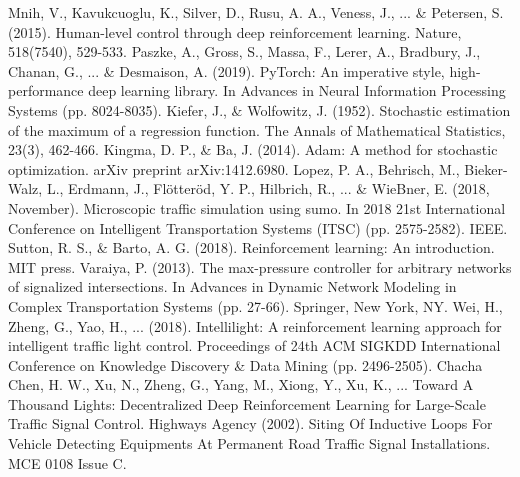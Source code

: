 \documentclass[conference]{IEEEtran}
\begin{document}
\begin{thebibliography}{00}
 Mnih, V., Kavukcuoglu, K., Silver, D., Rusu, A. A., Veness, J.,  ... \& Petersen, S. (2015). Human-level control through deep reinforcement learning. Nature, 518(7540), 529-533.
 Paszke, A., Gross, S., Massa, F., Lerer, A., Bradbury, J., Chanan, G., ... \& Desmaison, A. (2019). PyTorch: An imperative style, high-performance deep learning library. In Advances in Neural Information Processing Systems (pp. 8024-8035).
 Kiefer, J., \& Wolfowitz, J. (1952). Stochastic estimation of the maximum of a regression function. The Annals of Mathematical Statistics, 23(3), 462-466.
 Kingma, D. P., \& Ba, J. (2014). Adam: A method for stochastic optimization. arXiv preprint arXiv:1412.6980.
 Lopez, P. A., Behrisch, M., Bieker-Walz, L., Erdmann, J., Flötteröd, Y. P., Hilbrich, R., ... \& WieBner, E. (2018, November). Microscopic traffic simulation using sumo. In 2018 21st International Conference on Intelligent Transportation Systems (ITSC) (pp. 2575-2582). IEEE.
 Sutton, R. S., \& Barto, A. G. (2018). Reinforcement learning: An introduction. MIT press.
 Varaiya, P. (2013). The max-pressure controller for arbitrary networks of signalized intersections. In Advances in Dynamic Network Modeling in Complex Transportation Systems (pp. 27-66). Springer, New York, NY.
 Wei, H., Zheng, G., Yao, H., ... (2018). Intellilight: A reinforcement learning approach for intelligent traffic light control. Proceedings of  24th ACM SIGKDD International Conference on Knowledge Discovery \& Data Mining (pp. 2496-2505).
 Chacha Chen, H. W., Xu, N., Zheng, G., Yang, M., Xiong, Y., Xu, K., ... Toward A Thousand Lights: Decentralized Deep Reinforcement Learning for Large-Scale Traffic Signal Control.
 Highways Agency (2002). Siting Of Inductive Loops For Vehicle Detecting Equipments At Permanent Road Traffic Signal Installations. MCE 0108 Issue C.
\end{thebibliography}
\end{document}

